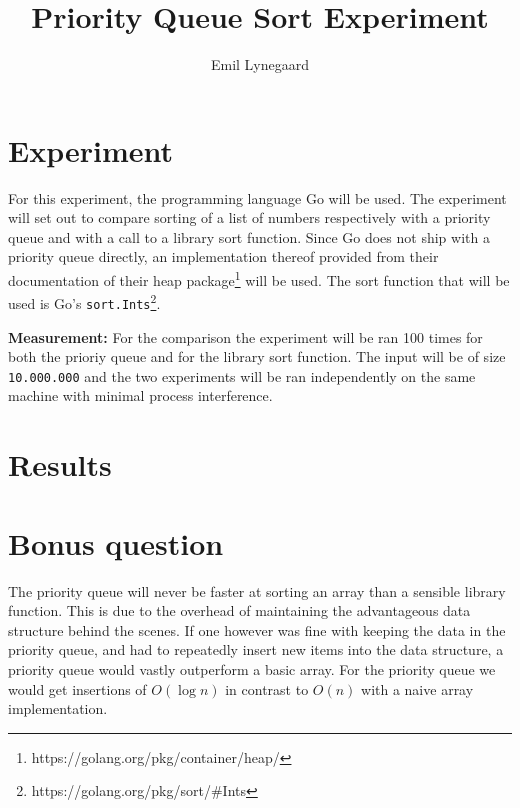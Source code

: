 \documentclass[a5paper]{article}
\title{Priority Queue Sort Experiment}
\author{Emil Lynegaard}
\begin{document}
  \maketitle
  \section{Experiment}
  For this experiment, the programming language Go will be used. The experiment will set out to compare sorting of a list of numbers respectively with a priority queue and with a call to a library sort function. Since Go does not ship with a priority queue directly, an implementation thereof provided from their documentation of their heap package\footnote{https://golang.org/pkg/container/heap/} will be used. The sort function that will be used is Go's \texttt{sort.Ints}\footnote{https://golang.org/pkg/sort/\#Ints}.

\textbf{Measurement:} For the comparison the experiment will be ran 100 times for both the prioriy queue and for the library sort function. The input will be of size \texttt{10.000.000} and the two experiments will be ran independently on the same machine with minimal process interference.

\section{Results}
\section{Bonus question}
The priority queue will never be faster at sorting an array than a sensible library function. This is due to the overhead of maintaining the advantageous data structure behind the scenes. If one however was fine with keeping the data in the priority queue, and had to repeatedly insert new items into the data structure, a priority queue would vastly outperform a basic array. For the priority queue we would get insertions of $O(\log n)$ in contrast to $O(n)$ with a naive array implementation.
\end{document}
